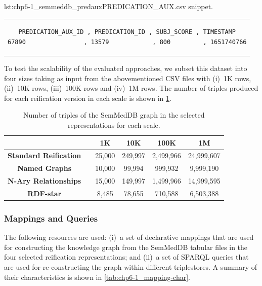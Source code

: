 \noindent\hspace{0.23\linewidth}\begin{minipage}{\linewidth}
\begin{captionedlisting}{lst:chp6-1_semmeddb_predaux}{PREDICATION\_AUX.csv snippet.}
\centering
\begin{tabular}{c}
\hspace{-7em}
{
\begin{lstlisting}[basicstyle=\ttfamily\small,label={lst:chp6-1_semmeddb_predaux},columns=flexible]
PREDICATION_AUX_ID , PREDICATION_ID , SUBJ_SCORE , TIMESTAMP
67890                , 13579            , 800         , 1651740766
\end{lstlisting}
}
\end{tabular}
\end{captionedlisting}
\end{minipage}


To test the scalability of the evaluated approaches, we subset this dataset into four sizes taking as input from the abovementioned CSV files with (i)~1K rows, (ii)~10K rows, (iii)~100K rows and (iv)~1M rows. The number of triples produced for each reification version in each scale is shown in \cref{tab:chp6-1_data-triple-number}.

\begin{table}[t]
\caption{Number of triples of the SemMedDB graph in the selected representations for each scale.}
\label{tab:chp6-1_data-triple-number}
\centering
\begin{tabular}{cccccc}
    \cmidrule{2-6}
    & & \textbf{1K} & \textbf{10K} & \textbf{100K} & \textbf{1M} \\ \midrule
    \textbf{Standard Reification} & & 25,000 & 249,997 & 2,499,966 & 24,999,607 \\ \midrule
    \textbf{Named Graphs} & & 10,000 & 99,994 & 999,932 & 9,999,190 \\ \midrule
    \textbf{N-Ary Relationships} & & 15,000 & 149,997 & 1,499,966 & 14,999,595 \\ \midrule
    \textbf{RDF-star} & & 8,485 & 78,655 & 710,588 & 6,503,388 \\ \bottomrule
\end{tabular}
\end{table}




\subsubsection{Mappings and Queries}
\label{sec:chp6-1_map-queries}
The following resources are used: 
(i)~a set of declarative mappings that are used for constructing the knowledge graph from the SemMedDB tabular files in the four selected reification representations; and (ii)~a set of SPARQL queries that are used for re-constructing the graph within different triplestores. A summary of their characteristics is shown in \cref{tab:chp6-1_mapping-char}.

